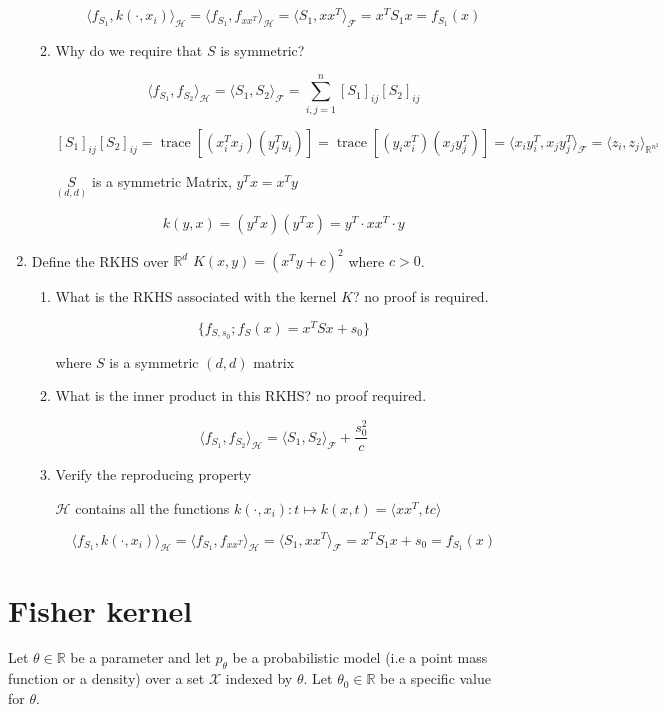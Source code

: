 \documentclass[11pt]{article}
\DeclareMathOperator{\trace}{trace}
\begin{document}
\begin{enumerate}
\begin{enumerate}
$$ \langle f_{S_1},k(\cdot,x_i)\rangle_{\mathcal{H}}=\langle f_{S_1},f_{xx^T}\rangle_{\mathcal{H}}=\langle S_1,xx^T\rangle_{\mathcal{F}}=x^TS_1 x= f_{S_1}(x)$$


\item Why do we require that $S$ is symmetric?

$$\langle f_{S_1},f_{S_2}\rangle_{\mathcal{H}}=\langle S_1,S_2\rangle_{\mathcal{F}}=\sum\limits_{i,j=1}^n[S_1]_{ij}[S_2]_{ij}$$


$$[S_1]_{ij}[S_2]_{ij}=\trace[(x_i^Tx_j)(y_j^Ty_i)]=\trace[(y_ix_i^T)(x_jy_j^T)]=\langle x_iy_i^T,x_jy_j^T\rangle_{\mathcal{F}}=\langle z_i,z_j\rangle_{\mathbb{R}^{n^2}}$$


$\underset{(d,d)}{S}$ is a symmetric Matrix,
$y^Tx=x^Ty$

$$k(y,x)=(y^Tx)(y^Tx)=y^T\cdot xx^T\cdot y$$

\end{enumerate}

\item Define the RKHS  over $\mathbb{R}^d$ $K(x,y)=(x^Ty+c)^2$ where $c>0$. 

\begin{enumerate}
\item What is the RKHS associated with the kernel $K$? no proof is required. 

$$\{f_{S,s_0}; f_S(x)=x^T S x+s_0\}$$

where $S$ is a symmetric $(d,d)$ matrix

\item What is the inner product in this RKHS? no proof required.  


$$\langle f_{S_1},f_{S_2}\rangle_{\mathcal{H}}=\langle S_1,S_2\rangle_{\mathcal{F}}+\frac{s_0^2}c$$

\item Verify the reproducing property

$\mathcal{H}$ contains all the functions $k(\cdot,x_i): t\mapsto k(x,t)=\langle xx^T,tc\rangle$

$$ \langle f_{S_1},k(\cdot,x_i)\rangle_{\mathcal{H}}=\langle f_{S_1},f_{xx^T}\rangle_{\mathcal{H}}=\langle S_1,xx^T\rangle_{\mathcal{F}}=x^T S_1x+s_0= f_{S_1}(x)$$

\end{enumerate}

\end{enumerate}




\section{Fisher kernel} 
Let $\theta \in \mathbb{R}$ be a parameter and let $p_\theta$ be a probabilistic model (i.e a point mass function or a density) over a set $\mathcal{X}$ indexed by $\theta$. Let $\theta_0 \in \mathbb{R}$ be a specific value for $\theta$.
\end{document}
